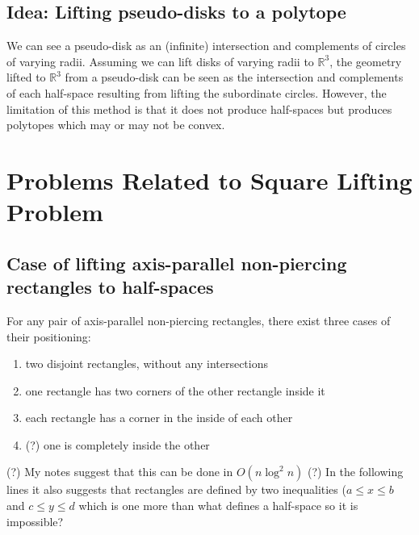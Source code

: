 \documentclass{NSF}
\begin{document}
\subsection{Idea: Lifting pseudo-disks to a polytope}
We can see a pseudo-disk as an (infinite) intersection and complements of circles of varying radii. Assuming we can lift disks of varying radii to $\mathbb{R}^3$, the geometry lifted to $\mathbb{R}^3$  from a pseudo-disk can be seen as the intersection and complements of each half-space resulting from lifting the subordinate circles. However, the limitation of this method is that it does not produce half-spaces but produces polytopes which may or may not be convex.




\section{Problems Related to Square Lifting Problem}

\subsection{Case of lifting axis-parallel non-piercing rectangles to half-spaces}
For any pair of axis-parallel non-piercing rectangles, there exist three cases of their positioning:
\begin{enumerate}
\item two disjoint rectangles, without any intersections
\item one rectangle has two corners of the other rectangle inside it
\item each rectangle has a corner in the inside of each other
\item (?) one is completely inside the other
\end{enumerate}
(?) My notes suggest that this can be done in $O(n\log^2{n})$
(?) In the following lines it also suggests that rectangles are defined by two inequalities ($a\leq x \leq b$ and $c \leq y \leq d$ which is one more than what defines a half-space so it is impossible?
\end{document}
